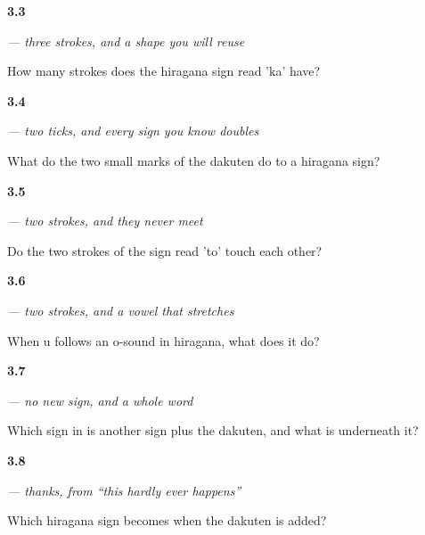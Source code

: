 \noindent\begin{minipage}[t]{\linewidth}
\raggedright
\hypertarget{review-JA-W03-ka-strokes}{\textbf{3.3}} \emph{ — three strokes, and a shape you will reuse}\par
\small How many strokes does the hiragana sign read 'ka' have?
\end{minipage}\par\medskip

\noindent\begin{minipage}[t]{\linewidth}
\raggedright
\hypertarget{review-JA-W03-dakuten-job}{\textbf{3.4}} \emph{— two ticks, and every sign you know doubles}\par
\small What do the two small marks of the dakuten do to a hiragana sign?
\end{minipage}\par\medskip

\noindent\begin{minipage}[t]{\linewidth}
\raggedright
\hypertarget{review-JA-W03-to-join}{\textbf{3.5}} \emph{ — two strokes, and they never meet}\par
\small Do the two strokes of the sign read 'to' touch each other?
\end{minipage}\par\medskip

\noindent\begin{minipage}[t]{\linewidth}
\raggedright
\hypertarget{review-JA-W03-u-long}{\textbf{3.6}} \emph{ — two strokes, and a vowel that stretches}\par
\small When u follows an o-sound in hiragana, what does it do?
\end{minipage}\par\medskip

\noindent\begin{minipage}[t]{\linewidth}
\raggedright
\hypertarget{review-JA-W03-arigatou-read-ga}{\textbf{3.7}} \emph{ — no new sign, and a whole word}\par
\small Which sign in  is another sign plus the dakuten, and what is underneath it?
\end{minipage}\par\medskip

\noindent\begin{minipage}[t]{\linewidth}
\raggedright
\hypertarget{review-JA-C01-arigatou-dakuten}{\textbf{3.8}} \emph{ — thanks, from “this hardly ever happens”}\par
\small Which hiragana sign becomes  when the dakuten is added?
\end{minipage}\par\medskip

